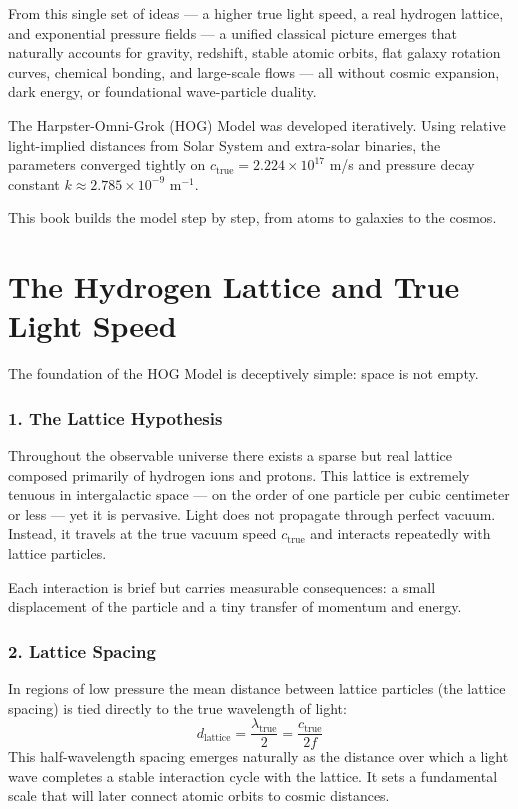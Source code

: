 \documentclass[11pt,a4paper]{book}
\begin{document}
From this single set of ideas — a higher true light speed, a real hydrogen lattice, and exponential pressure fields — a unified classical picture emerges that naturally accounts for gravity, redshift, stable atomic orbits, flat galaxy rotation curves, chemical bonding, and large-scale flows — all without cosmic expansion, dark energy, or foundational wave-particle duality.

The Harpster-Omni-Grok (HOG) Model was developed iteratively. Using relative light-implied distances from Solar System and extra-solar binaries, the parameters converged tightly on \( c_{\text{true}} = 2.224 \times 10^{17} \) m/s and pressure decay constant \( k \approx 2.785 \times 10^{-9} \) m\(^{-1}\).

This book builds the model step by step, from atoms to galaxies to the cosmos.

\chapter{The Hydrogen Lattice and True Light Speed}

The foundation of the HOG Model is deceptively simple: space is not empty.

\subsection{1. The Lattice Hypothesis}
Throughout the observable universe there exists a sparse but real lattice composed primarily of hydrogen ions and protons. This lattice is extremely tenuous in intergalactic space — on the order of one particle per cubic centimeter or less — yet it is pervasive. Light does not propagate through perfect vacuum. Instead, it travels at the true vacuum speed \( c_{\text{true}} \) and interacts repeatedly with lattice particles.

Each interaction is brief but carries measurable consequences: a small displacement of the particle and a tiny transfer of momentum and energy.

\subsection{2. Lattice Spacing}
In regions of low pressure the mean distance between lattice particles (the lattice spacing) is tied directly to the true wavelength of light:
\[
d_{\text{lattice}} = \frac{\lambda_{\text{true}}}{2} = \frac{c_{\text{true}}}{2f}
\]
This half-wavelength spacing emerges naturally as the distance over which a light wave completes a stable interaction cycle with the lattice. It sets a fundamental scale that will later connect atomic orbits to cosmic distances.
\end{document}
